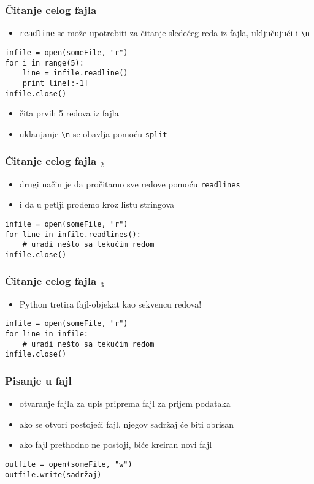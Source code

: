 \documentclass[utf8,compress]{beamer}
\begin{document}
\begin{frame}[fragile]
  \frametitle{Čitanje celog fajla}
  \begin{itemize}
    \item \texttt{readline} se može upotrebiti za čitanje sledećeg reda iz fajla, uključujući i \texttt{\textbackslash n}
  \end{itemize}
\begin{verbatim}
infile = open(someFile, "r")
for i in range(5):
    line = infile.readline()
    print line[:-1]
infile.close()
\end{verbatim}
  \begin{itemize}
    \item čita prvih 5 redova iz fajla
    \item uklanjanje \texttt{\textbackslash n} se obavlja pomoću \texttt{split}
  \end{itemize}
\end{frame}

\begin{frame}[fragile]
  \frametitle{Čitanje celog fajla $_2$}
  \begin{itemize}
    \item drugi način je da pročitamo sve redove pomoću \texttt{readlines}
    \item i da u petlji prođemo kroz listu stringova
  \end{itemize}
\begin{verbatim}
infile = open(someFile, "r")
for line in infile.readlines():
    # uradi nešto sa tekućim redom
infile.close()
\end{verbatim}
\end{frame}


\begin{frame}[fragile]
  \frametitle{Čitanje celog fajla $_3$}
  \begin{itemize}
    \item Python tretira fajl-objekat kao sekvencu redova!
  \end{itemize}
\begin{verbatim}
infile = open(someFile, "r")
for line in infile:
    # uradi nešto sa tekućim redom
infile.close()
\end{verbatim}
\end{frame}

\begin{frame}[fragile]
  \frametitle{Pisanje u fajl}
  \begin{itemize}
    \item otvaranje fajla za upis priprema fajl za prijem podataka
    \item ako se otvori postojeći fajl, njegov sadržaj će biti obrisan
    \item ako fajl prethodno ne postoji, biće kreiran novi fajl
  \end{itemize}
\begin{verbatim}
outfile = open(someFile, "w")
outfile.write(sadržaj)
\end{verbatim}
\end{frame}
\end{document}
